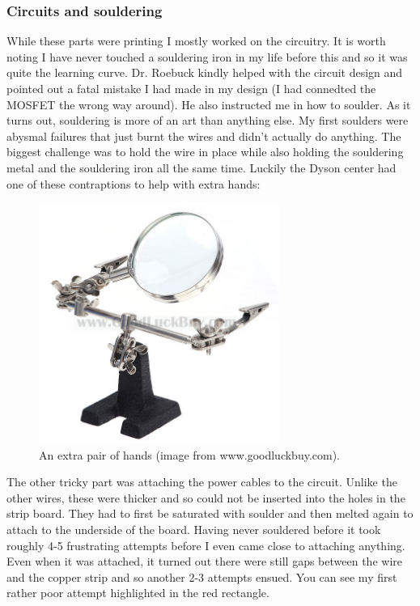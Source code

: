 \documentclass[a4paper]{article}
\begin{document}
\subsubsection{Circuits and souldering}
While these parts were printing I mostly worked on the circuitry.
It is worth noting I have never touched a souldering iron in my life before this and so it was quite the learning curve.
Dr. Roebuck kindly helped with the circuit design and pointed out a fatal mistake I had made in my design (I had connedted the MOSFET the wrong way around).
He also instructed me in how to soulder.
As it turns out, souldering is more of an art than anything else.
My first soulders were abysmal failures that just burnt the wires and didn't actually do anything.
The biggest challenge was to hold the wire in place while also holding the souldering metal and the souldering iron all the same time.
Luckily the Dyson center had one of these contraptions to help with extra hands:

\begin{figure}[H]
  \centering
    \includegraphics[width=0.7\textwidth]{figures/clamps.jpg}
    \caption{An extra pair of hands (image from www.goodluckbuy.com).}
  \label{fig:f2}
\end{figure}

The other tricky part was attaching the power cables to the circuit.
Unlike the other wires, these were thicker and so could not be inserted into the holes in the strip board.
They had to first be saturated with soulder and then melted again to attach to the underside of the board.
Having never souldered before it took roughly 4-5 frustrating attempts before I even came close to attaching anything.
Even when it was attached, it turned out there were still gaps between the wire and the copper strip and so another 2-3 attempts ensued.
You can see my first rather poor attempt highlighted in the red rectangle.
\end{document}
